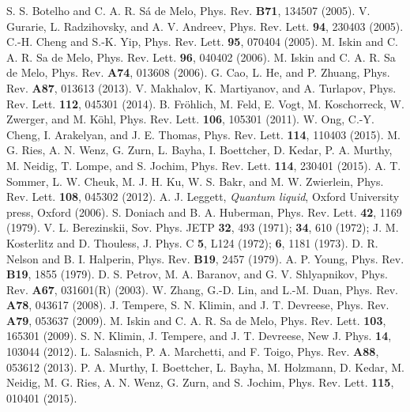 \documentclass[aps,prd,amsmath,two column,nofootinbib,amssymb,referee]{revtex4}
\begin{document}
\begin{thebibliography}{99}
      S. S. Botelho and C. A. R. S\'a de Melo, Phys. Rev. {\bf B71}, 134507 (2005).
        V. Gurarie, L. Radzihovsky, and A. V. Andreev, Phys. Rev. Lett. {\bf94}, 230403 (2005).
         C.-H. Cheng and S.-K. Yip, Phys. Rev. Lett. {\bf95}, 070404 (2005).
           M. Iskin and C. A. R. Sa de Melo, Phys. Rev. Lett. {\bf96}, 040402 (2006).
           M. Iskin and C. A. R. Sa de Melo, Phys. Rev. {\bf A74}, 013608 (2006).
          {G. Cao, L. He, and P. Zhuang, Phys. Rev. {\bf A87}, 013613 (2013).}
            V. Makhalov, K. Martiyanov, and A. Turlapov, Phys. Rev. Lett. {\bf112}, 045301 (2014).
             B. Fr\"ohlich, M. Feld, E. Vogt, M. Koschorreck, W. Zwerger, and M. K\"ohl, Phys. Rev. Lett. {\bf106}, 105301 (2011).
            W. Ong, C.-Y. Cheng, I. Arakelyan, and J. E. Thomas, Phys. Rev. Lett. {\bf114}, 110403 (2015).
            M. G. Ries, A. N. Wenz, G. Zurn, L. Bayha, I. Boettcher, D. Kedar, P. A. Murthy, M. Neidig, T. Lompe, and S. Jochim, Phys. Rev. Lett. {\bf114}, 230401 (2015).
            A. T. Sommer, L. W. Cheuk, M. J. H. Ku, W. S. Bakr, and M. W. Zwierlein, Phys. Rev. Lett. {\bf108}, 045302 (2012).
    A. J. Leggett, \emph{Quantum liquid}, Oxford University press, Oxford (2006).
  S. Doniach and B. A. Huberman, Phys. Rev. Lett. {\bf42}, 1169 (1979).
                V. L. Berezinskii, Sov. Phys. JETP {\bf32}, 493 (1971); {\bf34}, 610 (1972); J. M. Kosterlitz and D. Thouless, J. Phys. C {\bf5}, L124 (1972); {\bf6}, 1181 (1973).
    D. R. Nelson and B. I. Halperin, Phys. Rev. {\bf B19}, 2457 (1979).
             A. P. Young, Phys. Rev. {\bf B19}, 1855 (1979).
       D. S. Petrov, M. A. Baranov, and G. V. Shlyapnikov, Phys. Rev. {\bf A67}, 031601(R) (2003).
        W. Zhang, G.-D. Lin, and L.-M. Duan, Phys. Rev. {\bf A78}, 043617 (2008).
       J. Tempere, S. N. Klimin, and J. T. Devreese, Phys. Rev. {\bf A79}, 053637 (2009).
         M. Iskin and C. A. R. Sa de Melo, Phys. Rev. Lett. {\bf 103}, 165301 (2009).
       S. N. Klimin, J. Tempere, and J. T. Devreese, New J. Phys. {\bf 14}, 103044 (2012).
       L. Salasnich, P. A. Marchetti, and F. Toigo, Phys. Rev. {\bf A88}, 053612 (2013).
       P. A. Murthy, I. Boettcher, L. Bayha, M. Holzmann, D. Kedar, M. Neidig, M. G. Ries, A. N. Wenz, G. Zurn, and S. Jochim, Phys. Rev. Lett. {\bf 115}, 010401 (2015).

\end{thebibliography}
\end{document}

